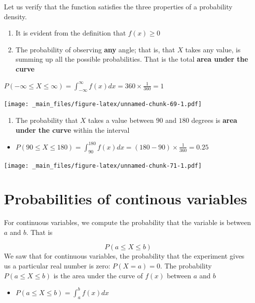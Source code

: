 \documentclass[
]{book}
\providecommand{\tightlist}{%
  \setlength{\itemsep}{0pt}\setlength{\parskip}{0pt}}
\begin{document}
Let us verify that the function satisfies the three properties of a probability density.

\begin{enumerate}
\def\labelenumi{\arabic{enumi})}
\item
  It is evident from the definition that \(f(x) \geq 0\)
\item
  The probability of observing \textbf{any} angle; that is, that \(X\) takes any value, is summing up all the possible probabilities. That is the total \textbf{area under the curve}
\end{enumerate}

\(P(-\infty\leq X \leq \infty)= \int_{-\infty}^{\infty} f(x) dx = 360\times \frac{1}{360}= 1\)

\texttt{[image: \_main\_files/figure-latex/unnamed-chunk-69-1.pdf]}

\begin{enumerate}
\def\labelenumi{\arabic{enumi})}
\setcounter{enumi}{2}
\tightlist
\item
  The probability that \(X\) takes a value between \(90\) and \(180\) degrees is \textbf{area under the curve} within the interval
\end{enumerate}

\begin{itemize}
\tightlist
\item
  \(P(90 \leq X \leq 180) = \int_{90}^{180} f(x) dx = (180-90)\times \frac{1}{360}=0.25\)
\end{itemize}

\texttt{[image: \_main\_files/figure-latex/unnamed-chunk-71-1.pdf]}

\hypertarget{probabilities-of-continous-variables}{%
\section{Probabilities of continous variables}\label{probabilities-of-continous-variables}}

For continuous variables, we compute the probability that the variable is between \(a\) and \(b\). That is

\[P(a \leq X \leq b)\]
We saw that for continuous variables, the probability that the experiment gives us a particular real number is zero: \(P(X=a)=0\). The probability \(P(a \leq X \leq b)\) is the area under the curve of \(f(x)\) between \(a\) and \(b\)

\begin{itemize}
\tightlist
\item
  \(P(a \leq X \leq b) = \int_{a}^{b} f(x) dx\)
\end{itemize}
\end{document}
